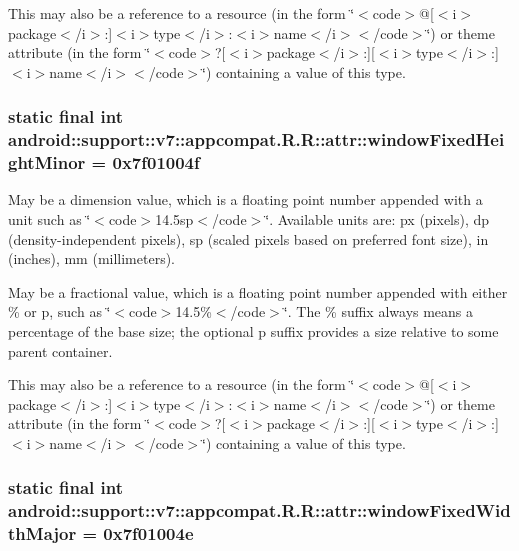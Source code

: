 This may also be a reference to a resource (in the form \char`\"{}$<$code$>$@\mbox{[}$<$i$>$package$<$/i$>$:\mbox{]}$<$i$>$type$<$/i$>$:$<$i$>$name$<$/i$>$$<$/code$>$\char`\"{}) or theme attribute (in the form \char`\"{}$<$code$>$?\mbox{[}$<$i$>$package$<$/i$>$:\mbox{]}\mbox{[}$<$i$>$type$<$/i$>$:\mbox{]}$<$i$>$name$<$/i$>$$<$/code$>$\char`\"{}) containing a value of this type. \hypertarget{classandroid_1_1support_1_1v7_1_1appcompat_1_1_r_1_1attr_289d25f6cbbed4f50295c450aa7b8970}{
\subsubsection[{windowFixedHeightMinor}]{\setlength{\rightskip}{0pt plus 5cm}static final int android::support::v7::appcompat.R.R::attr::windowFixedHeightMinor = 0x7f01004f}}
\label{classandroid_1_1support_1_1v7_1_1appcompat_1_1_r_1_1attr_289d25f6cbbed4f50295c450aa7b8970}


May be a dimension value, which is a floating point number appended with a unit such as \char`\"{}$<$code$>$14.5sp$<$/code$>$\char`\"{}. Available units are: px (pixels), dp (density-independent pixels), sp (scaled pixels based on preferred font size), in (inches), mm (millimeters). 

May be a fractional value, which is a floating point number appended with either \% or p, such as \char`\"{}$<$code$>$14.5\%$<$/code$>$\char`\"{}. The \% suffix always means a percentage of the base size; the optional p suffix provides a size relative to some parent container. 

This may also be a reference to a resource (in the form \char`\"{}$<$code$>$@\mbox{[}$<$i$>$package$<$/i$>$:\mbox{]}$<$i$>$type$<$/i$>$:$<$i$>$name$<$/i$>$$<$/code$>$\char`\"{}) or theme attribute (in the form \char`\"{}$<$code$>$?\mbox{[}$<$i$>$package$<$/i$>$:\mbox{]}\mbox{[}$<$i$>$type$<$/i$>$:\mbox{]}$<$i$>$name$<$/i$>$$<$/code$>$\char`\"{}) containing a value of this type. \hypertarget{classandroid_1_1support_1_1v7_1_1appcompat_1_1_r_1_1attr_619558789fddcc533fa0c9d5207575f2}{
\subsubsection[{windowFixedWidthMajor}]{\setlength{\rightskip}{0pt plus 5cm}static final int android::support::v7::appcompat.R.R::attr::windowFixedWidthMajor = 0x7f01004e}}
\label{classandroid_1_1support_1_1v7_1_1appcompat_1_1_r_1_1attr_619558789fddcc533fa0c9d5207575f2}


